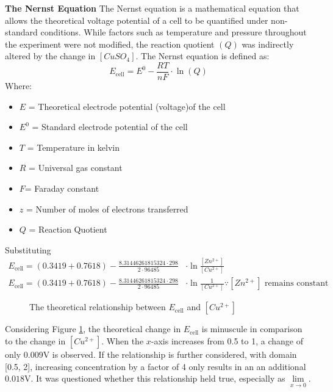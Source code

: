 \documentclass[11pt,a4paper]{article}
\begin{document}
	

	\textbf{The Nernst Equation}\newline
	The Nernst equation is a mathematical equation that allows the theoretical voltage potential of a cell to be quantified under non-standard conditions. While factors such as temperature and pressure throughout the experiment were not modified, the reaction quotient $(Q)$ was indirectly altered by the change in $[CuSO_4]$. 
\newline The Nernst equation is defined as:
	$$
	E_{\textrm{cell}}=E^0 - \frac{RT}{nF}\cdot \ln(Q)
	$$
	Where:
	\begin{itemize}
		\item $E$ = Theoretical electrode potential (voltage)of the cell
		\item $E^0$ = Standard electrode potential of the cell
		\item $T$ = Temperature in kelvin 
		\item $R$ = Universal gas constant
		\item $F$= Faraday constant
		\item $z$ = Number of moles of electrons transferred
		\item $Q$ = Reaction Quotient
		

	\end{itemize}
Substituting 
\begin{align*}
E_{\textrm{cell}}=(0.3419+0.7618)-\frac{8.31446261815324\cdot298}{2\cdot96485}&\cdot\ln\frac{[Zn^{2+}]}{[Cu^{2+}]}\\
E_{\textrm{cell}}=(0.3419+0.7618)-\frac{8.31446261815324\cdot298}{2\cdot96485}&\cdot\ln\frac{1}{[Cu^{2+}]} \because [Zn^{2+}]\textrm{ remains constant}
\end{align*}

\begin{figure}

	\centering

 
		\caption{The theoretical relationship between $E_{\textrm{cell}}$ and $[Cu^{2+}]$}
		\label{ogLog}
\end{figure}
\newpage
Considering Figure \ref{ogLog}, the theoretical change in $E_\textrm{cell}$ is minuscule in comparison to the change in $[Cu^{2+}]$. When the $x$-axis increases from 0.5 to 1, a change of only $0.009$V is observed. If the relationship is further considered, with domain [0.5, 2], increasing concentration by a factor of 4 only results in an an additional $0.018$V. It was questioned whether this relationship held true, especially as $\lim\limits_{x\to 0}$.
\end{document}
